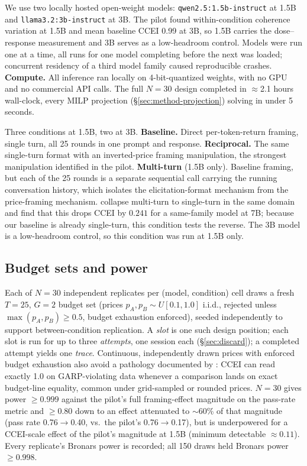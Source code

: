 \documentclass{article}
\begin{document}
We use two locally hosted open-weight models: \texttt{qwen2.5:1.5b-instruct} at 1.5B and
\texttt{llama3.2:3b-instruct} at 3B. The pilot found within-condition coherence variation at 1.5B
and mean baseline CCEI 0.99 at 3B, so 1.5B carries the dose--response measurement and 3B serves as
a low-headroom control. Models were run one at a time, all runs for one model completing before
the next was loaded; concurrent residency of a third model family caused reproducible crashes.
\textbf{Compute.} All inference ran locally on 4-bit-quantized weights, with no GPU and no
commercial API calls. The full $N=30$ design completed in $\approx$2.1 hours wall-clock, every
MILP projection (\S\ref{sec:method-projection}) solving in under 5 seconds.

Three conditions at 1.5B, two at 3B. \textbf{Baseline.} Direct per-token-return framing, single
turn, all 25 rounds in one prompt and response. \textbf{Reciprocal.} The same single-turn format
with an inverted-price framing manipulation, the strongest manipulation identified in the pilot.
\textbf{Multi-turn} (1.5B only). Baseline framing, but each of the 25 rounds is a separate
sequential call carrying the running conversation history, which isolates the elicitation-format
mechanism from the price-framing mechanism. \citet{wang2025tactics} collapse multi-turn to
single-turn in the same domain and find that this drops CCEI by $0.241$ for a same-family model at
7B; because our baseline is already single-turn, this condition tests the reverse. The 3B model is
a low-headroom control, so this condition was run at 1.5B only.

\subsection{Budget sets and power}

Each of $N=30$ independent replicates per (model, condition) cell draws a fresh $T=25$, $G=2$
budget set (prices $p_A,p_B\sim U[0.1,1.0]$ i.i.d., rejected unless $\max(p_A,p_B)\ge0.5$, budget
exhaustion enforced), seeded independently to support between-condition replication. A
\emph{slot} is one such design position; each slot is run for up to three \emph{attempts}, one
session each (\S\ref{sec:discard}); a completed attempt yields one \emph{trace}. Continuous,
independently drawn prices with enforced budget exhaustion also avoid a pathology documented by
\citet{andrews2026revealed}: CCEI can read exactly 1.0 on GARP-violating data whenever a
comparison lands on exact budget-line equality, common under grid-sampled or rounded prices.
$N=30$ gives power $\ge0.999$ against the pilot's full framing-effect magnitude on the pass-rate
metric and $\ge0.80$ down to an effect attenuated to $\sim$60\% of that magnitude (pass rate
0.76$\to$0.40, vs.\ the pilot's 0.76$\to$0.17), but is underpowered for a CCEI-scale effect of the
pilot's magnitude at 1.5B (minimum detectable $\approx0.11$). Every replicate's Bronars power
\citep{bronars1987power} is recorded; all 150 draws held Bronars power $\ge0.998$.
\end{document}
